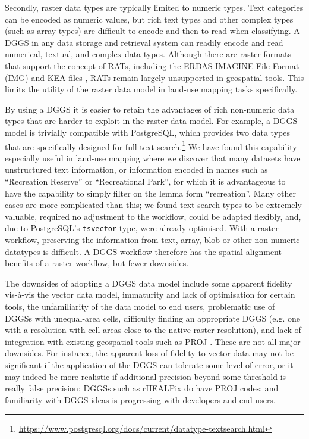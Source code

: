 \documentclass[]{interact}
\theoremstyle{plain}%
\theoremstyle{definition}
\theoremstyle{remark}
\begin{document}
Secondly, raster data types are typically limited to numeric types. Text categories can be encoded as numeric values, but rich text types and other complex types (such as array types) are difficult to encode and then to read when classifying. A \ac{DGGS} in any data storage and retrieval system can readily encode and read numerical, textual, and complex data types. Although there are raster formats that support the concept of \acp{RAT}, including the ERDAS IMAGINE File Format (IMG) and KEA files \citep{bunting2013}, \acp{RAT} remain largely unsupported in geospatial tools. This limits the utility of the raster data model in land-use mapping tasks specifically.

By using a \ac{DGGS} it is easier to retain the advantages of rich non-numeric data types that are harder to exploit in the raster data model. For example, a \ac{DGGS} model is trivially compatible with PostgreSQL, which provides two data types that are specifically designed for full text search.\footnote{\url{https://www.postgresql.org/docs/current/datatype-textsearch.html}} We have found this capability especially useful in land-use mapping where we discover that many datasets have unstructured text information, or information encoded in names such as ``Recreation Reserve'' or ``Recreational Park'', for which it is advantageous to have the capability to simply filter on the lemma form ``recreation''. Many other cases are more complicated than this; we found text search types to be extremely valuable, required no adjustment to the workflow, could be adapted flexibly, and, due to PostgreSQL's \texttt{tsvector} type, were already optimised. With a raster workflow, preserving the information from text, array, blob or other non-numeric datatypes is difficult. A \ac{DGGS} workflow therefore has the spatial alignment benefits of a raster workflow, but fewer downsides.

The downsides of adopting a \ac{DGGS} data model include some apparent fidelity vis-\`{a}-vis the vector data model, immaturity and lack of optimisation for certain tools, the unfamiliarity of the data model to end users, problematic use of \acp{DGGS} with unequal-area cells, difficulty finding an appropriate \ac{DGGS} (e.g. one with a resolution with cell areas close to the native raster resolution), and lack of integration with existing geospatial tools such as PROJ \citep{thompson2022ease}. These are not all major downsides. For instance, the apparent loss of fidelity to vector data may not be significant if the application of the \ac{DGGS} can tolerate some level of error, or it may indeed be more realistic if additional precision beyond some threshold is really false precision; \acp{DGGS} such as rHEALPix do have PROJ codes; and familiarity with \ac{DGGS} ideas is progressing with developers and end-users.
\end{document}
